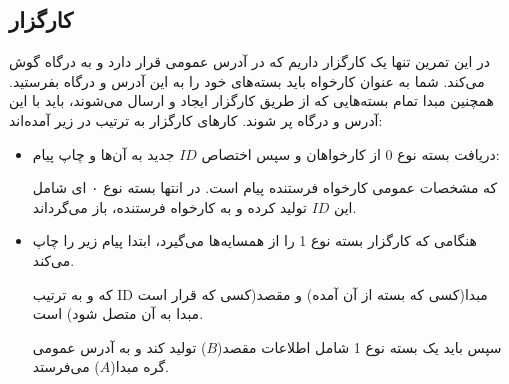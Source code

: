 \subsection{کارگزار}
در این تمرین تنها یک کارگزار داریم که در آدرس عمومی
قرار دارد و به درگاه 
گوش می‌کند. شما به عنوان کارخواه باید بسته‌های خود را به این آدرس و درگاه بفرستید. همچنین مبدا تمام بسته‌هایی که از طریق کارگزار ایجاد و ارسال می‌شوند، باید با این آدرس و درگاه پر شوند.
کار‌های کارگزار به ترتیب در زیر آمده‌اند:

\begin{itemize}
\item
دریافت بسته نوع 0 از کار‌خواهان و سپس اختصاص $ID$ جدید به آن‌ها و چاپ پیام:
\begin{flushleft}
\end{flushleft}
که
مشخصات عمومی کارخواه فرستنده پیام است. در انتها بسته‌ نوع ۰ ای شامل این $ID$ تولید کرده و به کارخواه فرستنده، باز می‌گرداند.
\item
هنگامی که کارگزار بسته نوع 1 را از همسایه‌ها می‌گیرد، ابتدا پیام زیر را چاپ می‌کند.
\begin{flushleft}
\end{flushleft}
که 
و
به ترتیب ID مبدا(کسی که بسته از آن آمده) و مقصد(کسی که قرار است مبدا به آن متصل شود) است.

سپس باید یک بسته نوع 1 شامل اطلاعات مقصد($B$) تولید کند و به آدرس عمومی گره مبدا($A$) می‌فرستد.
\end{itemize}

